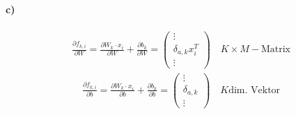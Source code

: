 \paragraph{c)}
\begin{gather}
\frac{\partial f_{k,i}}{\partial W} =\frac{\partial W_k \cdot x_i}{\partial W} +\frac{\partial b_{k}}{\partial W}= 
\begin{pmatrix}
\vdots \\
\delta_{a ,k} x_i ^T \\
\vdots
\end{pmatrix}
\quad K\times M -\text{Matrix}
\end{gather}
\begin{gather}
\frac{\partial f_{k,i}}{\partial b} = 
\frac{\partial W_k \cdot x_i}{\partial b} +\frac{\partial b_{k}}{\partial b}=
\begin{pmatrix}
\vdots \\
\delta_{a ,k} \\
\vdots
\end{pmatrix}
\quad K \text{dim. Vektor}
\end{gather}
